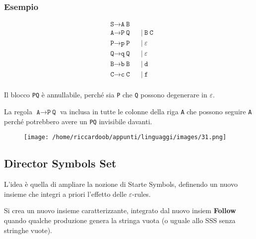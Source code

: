 \subsubsection{Esempio}
\begin{equation*}
    \begin{aligned}        
        &\texttt{S} \rightarrow \texttt{A}\ \texttt{B} \\
        &\texttt{A} \rightarrow \texttt{P}\ \texttt{Q} &&|\ \texttt{B}\ \texttt{C}\\
        &\texttt{P} \rightarrow \texttt{p}\ \texttt{P} &&|\ \varepsilon\\
        &\texttt{Q} \rightarrow \texttt{q}\ \texttt{Q} &&|\ \varepsilon\\
        &\texttt{B} \rightarrow \texttt{b}\ \texttt{B} &&|\ \texttt{d}\\
        &\texttt{C} \rightarrow \texttt{c}\ \texttt{C} &&|\ \texttt{f}\\
    \end{aligned}
\end{equation*}

Il blocco \texttt{PQ} è annullabile, perché sia \texttt{P} che \texttt{Q} possono degenerare in $\varepsilon$.

La regola $\texttt{A} \rightarrow \texttt{P}\ \texttt{Q}$ va inclusa in tutte le colonne della riga \texttt{A} che possono seguire \texttt{A} perché potrebbero avere un \texttt{PQ} invisibile davanti.
\begin{figure}[H]
    \centering
    \texttt{[image: /home/riccardoob/appunti/linguaggi/images/31.png]}
\end{figure}

\subsection{Director Symbols Set}
L'idea è quella di ampliare la nozione di Starte Symbols, definendo un nuovo insieme che integri a priori l'effetto delle $\varepsilon$-rules.

Si crea un nuovo insieme caratterizzante, integrato dal nuovo insiem \textbf{Follow} quando qualche produzione genera la stringa vuota (o uguale allo SSS senza stringhe vuote).

